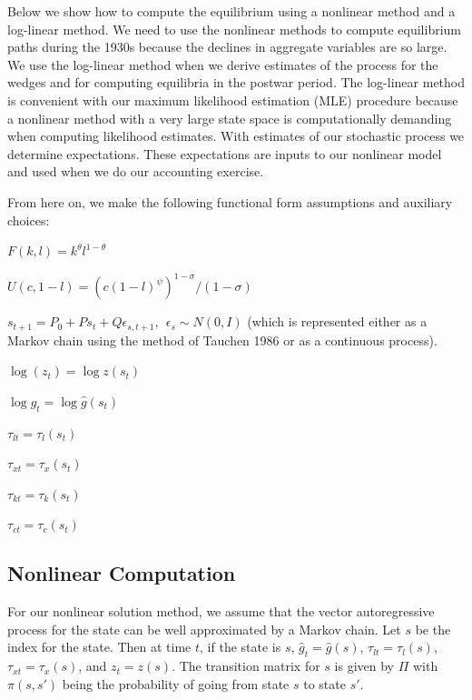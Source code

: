 Below we show how to compute the equilibrium
using a nonlinear method and a log-linear method.
We need to use the nonlinear methods to compute
equilibrium paths during the 1930s because the 
declines in aggregate variables are so large.
We use the log-linear method when we 
derive estimates of the process for the wedges
and for computing equilibria in the postwar period.
The log-linear method is convenient with our maximum likelihood
estimation (MLE) procedure because a nonlinear method
with a very large state space is computationally demanding
when computing likelihood estimates.  
With estimates of our stochastic process
we determine expectations.  These expectations are
inputs to our nonlinear model and used when we 
do our accounting exercise.

From here on, we make the following functional form
assumptions and auxiliary choices:
\item{} $F(k,l) = k^\theta l^{1-\theta}$
\item{} $U(c,1-l) = (c (1-l)^\psi)^{1-\sigma}/(1-\sigma)$
\item{} $s_{t+1} = P_0 + P s_t + Q \epsilon_{s,t+1},\ \  
               \epsilon_s\sim N(0,I)$
         (which is represented either as a Markov chain using the method
         of Tauchen 1986 or as a continuous process).
\item{} $\log(z_t)= \log z(s_t)$
\item{} $\log \hat g_t= \log \hat g(s_t)$
\item{} $\tau_{lt}= \tau_l(s_t)$
\item{} $\tau_{xt}= \tau_x(s_t)$
\item{} $\tau_{kt}= \tau_k(s_t)$
\item{} $\tau_{ct}= \tau_c(s_t)$

\bigskip
\bigskip
\subsection{Nonlinear Computation}

For our nonlinear solution method, we assume that the
vector autoregressive process for the state can be well approximated
by a  Markov chain.  
Let $s$ be the index for the state.  Then at time $t$, if the state
is $s$,
$\hat g_t= \hat g(s)$,
$\tau_{lt} = \tau_l(s)$,
$\tau_{xt} = \tau_x(s)$, and
$z_t =  z(s)$.
The transition matrix for $s$ is given by $\Pi$
with $\pi(s,s')$ being the probability of going from
state $s$ to state $s'$.

